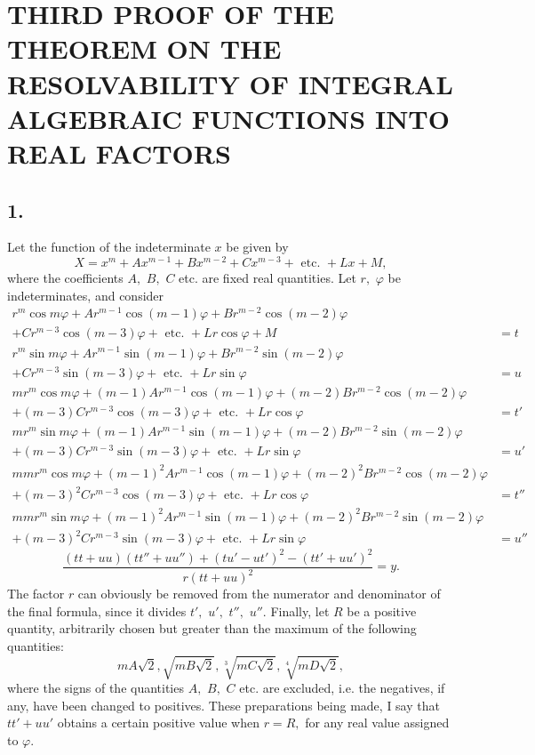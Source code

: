 \documentclass[14pt]{memoir}
\theoremstyle{plain}
\theoremstyle{remark}
\begin{document}
\section*{THIRD PROOF OF THE THEOREM ON THE RESOLVABILITY
OF INTEGRAL ALGEBRAIC FUNCTIONS INTO REAL FACTORS}

\subsection*{1.}

Let the function of the indeterminate \(x\) be given by
\[X = x^m + Ax^{m-1} + Bx^{m-2} + Cx^{m-3} + \text{ etc. } + Lx + M,\]
where the coefficients \(A,\) \(B,\) \(C\) etc. are fixed real quantities. Let \(r,\) \(\varphi\) be indeterminates, and consider
\[\begin{array}{rl}
r^m\cos m\varphi + A r^{m-1}\cos(m-1)\varphi + Br^{m-2}\cos(m-2)\varphi & \\
+ Cr^{m-3}\cos(m-3)\varphi + \text{ etc. } + Lr\cos\varphi + M &= t\\
r^m\sin m\varphi + Ar^{m-1}\sin(m-1)\varphi + Br^{m-2}\sin(m-2)\varphi & \\
+ Cr^{m-3}\sin(m-3)\varphi + \text{ etc. } + Lr\sin\varphi &= u\\
mr^m\cos m\varphi +(m-1)Ar^{m-1}\cos(m-1)\varphi+(m-2)Br^{m-2}\cos(m-2)\varphi &\\
+ (m-3)Cr^{m-3}\cos(m-3)\varphi + \text{ etc. } + Lr\cos\varphi &= t'\\
mr^m\sin m\varphi +(m-1)Ar^{m-1}\sin(m-1)\varphi + (m-2)Br^{m-2}\sin(m-2)\varphi &\\
+ (m-3)Cr^{m-3}\sin(m-3)\varphi + \text{ etc. } + Lr\sin\varphi &= u'\\
mmr^m\cos m\varphi+(m-1)^2Ar^{m-1}\cos(m-1)\varphi+(m-2)^2Br^{m-2}\cos(m-2)\varphi &\\
+ (m-3)^2Cr^{m-3}\cos(m-3)\varphi + \text{ etc. } + Lr\cos \varphi &= t''\\
mmr^m\sin m\varphi+(m-1)^2Ar^{m-1}\sin(m-1)\varphi+(m-2)^2Br^{m-2}\sin(m-2)\varphi &\\
+ (m-3)^2Cr^{m-3}\sin(m-3)\varphi + \text{ etc. } + Lr\sin\varphi &= u''
\end{array}\]
\[\frac{(tt+uu)(tt''+uu'')+(tu'-ut')^2-(tt'+uu')^2}{r(tt+uu)^2} = y.\]
The factor \(r\) can obviously be removed from the numerator and denominator of the final formula,  since it divides \(t',\) \(u',\) \(t'',\) \(u''\). Finally, let \(R\) be a positive quantity, arbitrarily chosen but greater than the maximum of the following quantities:
\[mA\sqrt{2}, \sqrt{mB\sqrt{2}}, \sqrt[3]{mC\sqrt{2}}, \sqrt[4]{mD\sqrt{2}},\]
where the signs of the quantities \(A,\) \(B,\) \(C\) etc. are excluded, i.e. the negatives, if any, have been changed to positives. These preparations being made, I say that \(tt'+uu'\) obtains a certain positive value when \(r = R,\) for any real value assigned to \(\varphi.\)
\end{document}
